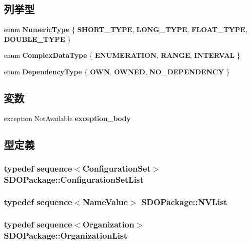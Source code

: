 \subsection*{列挙型}
\begin{DoxyCompactItemize}
\item 
enum {\bf NumericType} \{ {\bf SHORT\_\-TYPE}, 
{\bf LONG\_\-TYPE}, 
{\bf FLOAT\_\-TYPE}, 
{\bf DOUBLE\_\-TYPE}
 \}
\item 
enum {\bf ComplexDataType} \{ {\bf ENUMERATION}, 
{\bf RANGE}, 
{\bf INTERVAL}
 \}
\item 
enum {\bf DependencyType} \{ {\bf OWN}, 
{\bf OWNED}, 
{\bf NO\_\-DEPENDENCY}
 \}
\end{DoxyCompactItemize}
\subsection*{変数}
\begin{DoxyCompactItemize}
\item 
exception NotAvailable {\bf exception\_\-body}
\end{DoxyCompactItemize}


\subsection{型定義}
\subsubsection[{ConfigurationSetList}]{\setlength{\rightskip}{0pt plus 5cm}typedef sequence$<${\bf ConfigurationSet}$>$ {\bf SDOPackage::ConfigurationSetList}}\label{namespaceSDOPackage_ad9d3f3e4436d5ae8aa92fd71fa85e034}
\subsubsection[{NVList}]{\setlength{\rightskip}{0pt plus 5cm}typedef sequence$<${\bf NameValue}$>$ {\bf SDOPackage::NVList}}\label{namespaceSDOPackage_a51e72be2b0d7e550db7782ddb1d58e9d}
\subsubsection[{OrganizationList}]{\setlength{\rightskip}{0pt plus 5cm}typedef sequence$<${\bf Organization}$>$ {\bf SDOPackage::OrganizationList}}\label{namespaceSDOPackage_a31cbea00ad118b641831e30a56e80a72}
